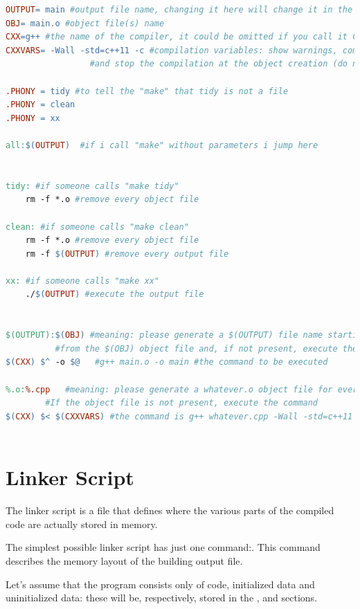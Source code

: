\begin{lstlisting}[language=make, basicstyle=\ttfamily \scriptsize]
OUTPUT= main #output file name, changing it here will change it in the whole file
OBJ= main.o #object file(s) name 
CXX=g++	#the name of the compiler, it could be omitted if you call it CXX: its a standard variable
CXXVARS= -Wall -std=c++11 -c #compilation variables: show warnings, compile with c++11 
			     #and stop the compilation at the object creation (do not link the file)

.PHONY = tidy #to tell the "make" that tidy is not a file 
.PHONY = clean
.PHONY = xx

all:$(OUTPUT)  #if i call "make" without parameters i jump here


tidy: #if someone calls "make tidy"
	rm -f *.o #remove every object file

clean: #if someone calls "make clean"
	rm -f *.o #remove every object file
	rm -f $(OUTPUT) #remove every output file

xx: #if someone calls "make xx"
	./$(OUTPUT) #execute the output file


$(OUTPUT):$(OBJ) #meaning: please generate a $(OUTPUT) file name starting 
		  #from the $(OBJ) object file and, if not present, execute the command
$(CXX) $^ -o $@   #g++ main.o -o main #the command to be executed

%.o:%.cpp	#meaning: please generate a whatever.o object file for every whatever.cpp file. 
		#If the object file is not present, execute the command
$(CXX) $< $(CXXVARS) #the command is g++ whatever.cpp -Wall -std=c++11 -c



\end{lstlisting}



\section{Linker Script}
The linker script is a file that defines where the various parts of the compiled code are actually stored in memory.

The simplest possible linker script has just one command:. This command describes the memory layout of the building output file.

Let's assume that the program consists only of code, initialized data and uninitialized data: these will be, respectively, stored in the ,  and  sections.

